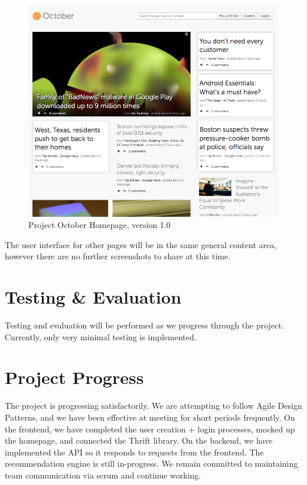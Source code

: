 \documentclass[11pt,letterpaper]{article}
\begin{document}
\begin{figure}
\centering
\includegraphics[scale=0.6]{img/homepage-v1.png}
\caption{Project October Homepage, version 1.0}
\label{fig:homepage-v1.0}
\end{figure}

The user interface for other pages will be in the same general content area, however there are no further screenshots to share at this time.

\section{Testing \& Evaluation}
\label{sec:testing}
Testing and evaluation will be performed as we progress through the project. Currently, only very minimal testing is implemented.

\section{Project Progress}
\label{sec:progress}
The project is progressing satisfactorily.
We are attempting to follow Agile Design Patterns, and we have been effective at meeting for short periods frequently.
On the frontend, we have completed the user creation + login processes, mocked up the homepage, and connected the Thrift library.
On the backend, we have implemented the API so it responds to requests from the frontend. The recommendation engine is still in-progress.
We remain committed to maintaining team communication via scrum and continue working.
\end{document}
